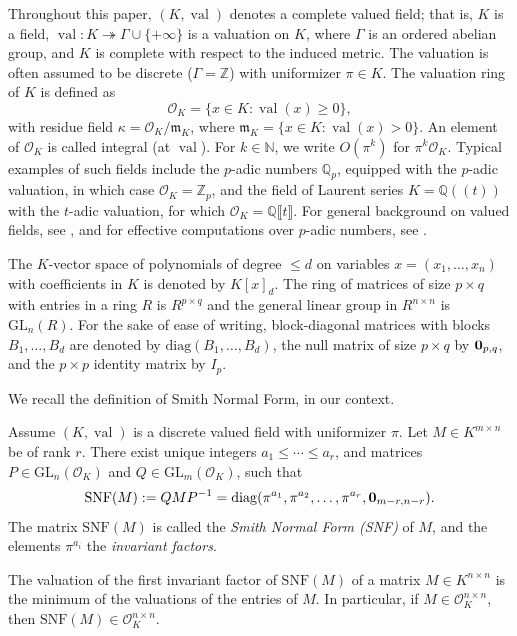 \documentclass{elsarticle}
\theoremstyle{plain}
\theoremstyle{definition}
\newcommand{\N}{\mathbb{N}} %
\DeclareMathOperator{\val}{val}
\def\QQ{\ensuremath{\mathbb{Q}}}
\def\ZZ{\ensuremath{\mathbb{Z}}}
\newcommand{\OK}{\mathcal{O}_K}
\def\diag{\mathrm{diag}}
\newcommand{\GL}{\mathrm{GL}}
\begin{document}
Throughout this paper, $(K,\val)$ denotes a complete valued field; that is, $K$ is a field,
$\val : K \twoheadrightarrow \Gamma \cup \{+\infty\}$ is a valuation on $K$, where $\Gamma$ 
is an ordered abelian group, and $K$ is complete with respect to the induced metric.
The valuation is often assumed to be discrete ($\Gamma=\ZZ$)
with uniformizer $\pi \in K$. The valuation ring of $K$ is defined as
$$
\OK = \{x \in K : \val(x) \geq 0\},
$$
with residue field $\kappa = \OK/\mathfrak{m}_K$, where
$\mathfrak{m}_K = \{x \in K : \val(x) > 0\}$.
An element of $\OK$ is called integral (at $\val$).
For $k \in \N$, we write $O(\pi^k)$ for $\pi^k \OK$.
Typical examples of such fields include the $p$-adic numbers 
$\QQ_p$, equipped with the $p$-adic valuation, in which case $\OK = \ZZ_p$, 
and the field of Laurent series
$K=\QQ(\!(t)\!)$ with the $t$-adic valuation,
for which $\OK = \QQ \llbracket t \rrbracket$.
For general background on valued fields, see \cite{Serre:1979,engler2005valued},
and for effective computations over $p$-adic numbers, see \cite{caruso_computations_2017}.

The $K$-vector space of polynomials of degree $\leq d$ on variables
$x=(x_1,\ldots,x_n)$
with coefficients in $K$ is denoted by $K[x]_{d}$. The ring of matrices of
size $p \times q$ with entries in a ring $R$ is $R^{p \times q}$ and the general
linear group in $R^{n \times n}$ is $\GL_n(R)$.
For the sake of ease of writing, block-diagonal matrices with blocks
$B_1,\ldots,B_d$ are denoted by $\diag(B_1, \ldots, B_d)$, the null matrix of
size $p \times q$ by ${\bf 0}_{p,q}$, and the $p \times p$ identity matrix by $I_p$.

We recall the definition of Smith Normal Form, in our context.

\begin{definition}\label{smith_nf}
  Assume $(K,\val)$ is a discrete valued field with uniformizer $\pi$.
  Let $M \in K^{m \times n}$ be of rank $r$. There exist unique integers
  $a_1 \leq \cdots \leq a_r$, and
  matrices $P \in \GL_n(\OK)$ and $Q \in \GL_m(\OK)$, such that
  $$
  \mathrm{SNF}(M) := QMP^{-1} = \diag(\pi^{a_1}, \pi^{a_2}, \ldots, \pi^{a_r}, {\bf 0}_{m-r,n-r}).
  $$
  The matrix $\mathrm{SNF}(M)$ is called the \emph{Smith Normal Form (SNF)} of $M$, and the elements $\pi^{a_i}$ the
  \emph{invariant factors}.
\end{definition}
\begin{remark}
  The valuation of the first invariant factor of $\mathrm{SNF}(M)$ of a matrix
  $M \in K^{n \times n}$ is the minimum of the valuations of the entries of
  $M$. In particular, if $M \in \OK^{n \times n}$, then $\mathrm{SNF}(M) \in \OK^{n \times n}$.
\end{remark}
\end{document}
